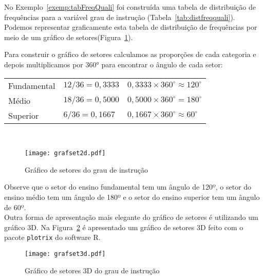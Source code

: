 \documentclass[11pt,fleqn]{book} %
\begin{document}
\begin{example} \label{exemp:grafset} 

No Exemplo~\ref{exemp:tabFreqQuali} foi construída uma tabela de distribuição de frequências para a variável grau de instrução (Tabela~\ref{tab:distfreqquali}). Podemos representar graficamente esta tabela de distribuição de frequências por meio de um gráfico de setores(Figura~\ref{fig:grafset2d}).

Para construir o gráfico de setores calculamos as proporções de cada categoria e depois multiplicamos por 360° para encontrar o ângulo de cada setor:

\begin{table}[h]
	\begin{eBox}
	\centering
	{\color{ocre} \begin{tabular}{l l l}
	\toprule
	Fundamental & $12/36=0,3333$ & $0,3333 \times 360^{\circ} \approx 120^{\circ}$ \\
	Médio & $18/36=0,5000$ & $0,5000 \times 360^{\circ} = 180^{\circ}$ \\
	Superior & $6/36=0,1667$ & $0,1667 \times 360^{\circ} \approx 60^{\circ}$ \\
	\bottomrule
	\end{tabular}} \\
	\end{eBox}
\end{table}

\vspace{2cm}

\begin{figure}[h!]
\centering\texttt{[image: grafset2d.pdf]}
\setlength{\abovecaptionskip}{0.5pt}
\caption{Gráfico de setores do grau de instrução}
\label{fig:grafset2d} %
\end{figure}

Observe que o setor do ensino fundamental tem um ângulo de 120º, o setor do ensino médio tem um ângulo de 180º e o setor do ensino superior tem um ângulo de 60º. \\


Outra forma de apresentação mais elegante do gráfico de setores é utilizando um gráfico 3D. Na Figura~\ref{fig:grafset3d} é apresentado um gráfico de setores 3D feito com o pacote \texttt{plotrix} do software R.


\begin{figure}[h!]
\centering\texttt{[image: grafset3d.pdf]}
\setlength{\abovecaptionskip}{0.5pt}
\caption{Gráfico de setores 3D do grau de instrução}
\label{fig:grafset3d} %
\end{figure}


\end{example}
\end{document}
